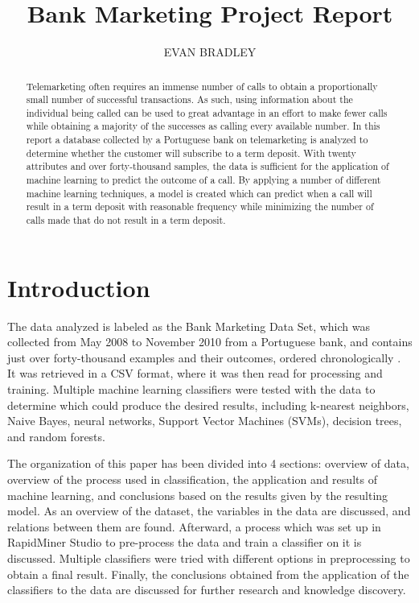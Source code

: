 \documentclass[prodmode]{acmsmall} %
\begin{document}

\title{Bank Marketing Project Report}
\author{
  EVAN BRADLEY
}

\begin{abstract}
  Telemarketing often requires an immense number of calls to obtain a
  proportionally small number of successful transactions. As such, using
  information about the individual being called can be used to great advantage
  in an effort to make fewer calls while obtaining a majority of the successes
  as calling every available number. In this report a database collected by a
  Portuguese bank on telemarketing is analyzed to determine whether the customer
  will subscribe to a term deposit. With twenty attributes and over
  forty-thousand samples, the data is sufficient for the application of machine
  learning to predict the outcome of a call. By applying a number of different
  machine learning techniques, a model is created which can predict when a call
  will result in a term deposit with reasonable frequency while minimizing the
  number of calls made that do not result in a term deposit.
\end{abstract}


\maketitle

\section{Introduction}
The data analyzed is labeled as the Bank Marketing Data Set, which was collected
from May 2008 to November 2010 from a Portuguese bank, and contains just over
forty-thousand examples and their outcomes, ordered chronologically
\cite{paper}. It was retrieved in a CSV format, where it was then read for
processing and training. Multiple machine learning classifiers were tested with
the data to determine which could produce the desired results, including
k-nearest neighbors, Naive Bayes, neural networks, Support Vector Machines
(SVMs), decision trees, and random forests.

The organization of this paper has been divided into 4 sections: overview of
data, overview of the process used in classification, the application and
results of machine learning, and conclusions based on the results given by the
resulting model. As an overview of the dataset, the variables in the data are
discussed, and relations between them are found. Afterward, a process which was
set up in RapidMiner Studio to pre-process the data and train a classifier on it
is discussed. Multiple classifiers were tried with different options in
preprocessing to obtain a final result. Finally, the conclusions obtained from
the application of the classifiers to the data are discussed for further
research and knowledge discovery.
\end{document}
